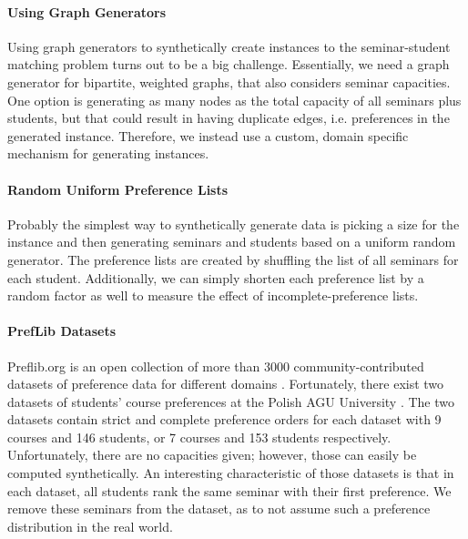 \paragraph{Using Graph Generators}
Using graph generators to synthetically create instances to the seminar-student matching problem turns out to be a big challenge. Essentially, we need a graph generator for bipartite, weighted graphs, that also considers seminar capacities. One option is generating as many nodes as the total capacity of all seminars plus students, but that could result in having duplicate edges, i.e. preferences in the generated instance. Therefore, we instead use a custom, domain specific mechanism for generating instances.

\paragraph{Random Uniform Preference Lists}
Probably the simplest way to synthetically generate data is picking a size for the instance and then generating seminars and students based on a uniform random generator. The preference lists are created by shuffling the list of all seminars for each student. Additionally, we can simply shorten each preference list by a random factor as well to measure the effect of incomplete-preference lists.

\paragraph{PrefLib Datasets}
Preflib.org is an open collection of more than 3000 community-contributed datasets of preference data for different domains \cite{PrefLib}. Fortunately, there exist two datasets of students' course preferences at the Polish AGU University \cite{preflib-dataset}. The two datasets contain strict and complete preference orders for each dataset with 9 courses and 146 students, or 7 courses and 153 students respectively. Unfortunately, there are no capacities given; however, those can easily be computed synthetically. An interesting characteristic of those datasets is that in each dataset, all students rank the same seminar with their first preference. We remove these seminars from the dataset, as to not assume such a preference distribution in the real world.

